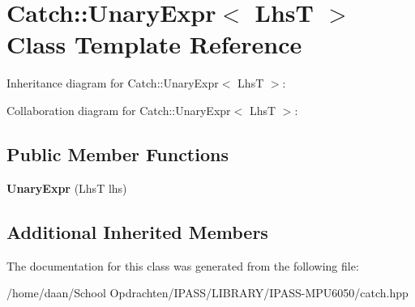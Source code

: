 \hypertarget{classCatch_1_1UnaryExpr}{}\section{Catch\+:\+:Unary\+Expr$<$ LhsT $>$ Class Template Reference}
\label{classCatch_1_1UnaryExpr}


Inheritance diagram for Catch\+:\+:Unary\+Expr$<$ LhsT $>$\+:


Collaboration diagram for Catch\+:\+:Unary\+Expr$<$ LhsT $>$\+:
\subsection*{Public Member Functions}
\begin{DoxyCompactItemize}
\item 
\mbox{\label{classCatch_1_1UnaryExpr_ae02f666a1e64da728628aa2033e1d6e7}} 
{\bfseries Unary\+Expr} (LhsT lhs)
\end{DoxyCompactItemize}
\subsection*{Additional Inherited Members}


The documentation for this class was generated from the following file\+:\begin{DoxyCompactItemize}
\item 
/home/daan/\+School Opdrachten/\+I\+P\+A\+S\+S/\+L\+I\+B\+R\+A\+R\+Y/\+I\+P\+A\+S\+S-\/\+M\+P\+U6050/catch.\+hpp\end{DoxyCompactItemize}
